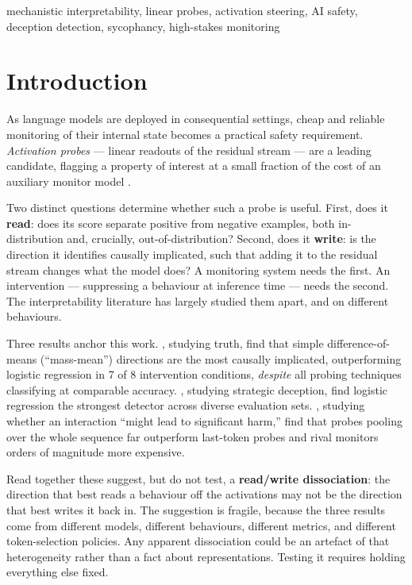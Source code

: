 \documentclass[conference]{IEEEtran}
\begin{document}
\begin{IEEEkeywords}
mechanistic interpretability, linear probes, activation steering, AI safety,
deception detection, sycophancy, high-stakes monitoring
\end{IEEEkeywords}

\section{Introduction}

As language models are deployed in consequential settings, cheap and reliable
monitoring of their internal state becomes a practical safety requirement.
\emph{Activation probes} --- linear readouts of the residual stream --- are a
leading candidate, flagging a property of interest at a small fraction of the
cost of an auxiliary monitor model \citep{alain2018,mckenzie2025}.

Two distinct questions determine whether such a probe is useful. First, does it
\textbf{read}: does its score separate positive from negative examples, both
in-distribution and, crucially, out-of-distribution? Second, does it
\textbf{write}: is the direction it identifies causally implicated, such that
adding it to the residual stream changes what the model does? A monitoring
system needs the first. An intervention --- suppressing a behaviour at inference
time --- needs the second. The interpretability literature has largely studied
them apart, and on different behaviours.

Three results anchor this work. \citet{marks2024}, studying truth, find that
simple difference-of-means (``mass-mean'') directions are the most causally
implicated, outperforming logistic regression in 7 of 8 intervention conditions,
\emph{despite} all probing techniques classifying at comparable accuracy.
\citet{goldowsky2025}, studying strategic deception, find logistic regression
the strongest detector across diverse evaluation sets. \citet{mckenzie2025},
studying whether an interaction ``might lead to significant harm,'' find that
probes pooling over the whole sequence far outperform last-token probes and
rival monitors orders of magnitude more expensive.

Read together these suggest, but do not test, a \textbf{read/write
dissociation}: the direction that best reads a behaviour off the activations may
not be the direction that best writes it back in. The suggestion is fragile,
because the three results come from different models, different behaviours,
different metrics, and different token-selection policies. Any apparent
dissociation could be an artefact of that heterogeneity rather than a fact about
representations. Testing it requires holding everything else fixed.
\end{document}
